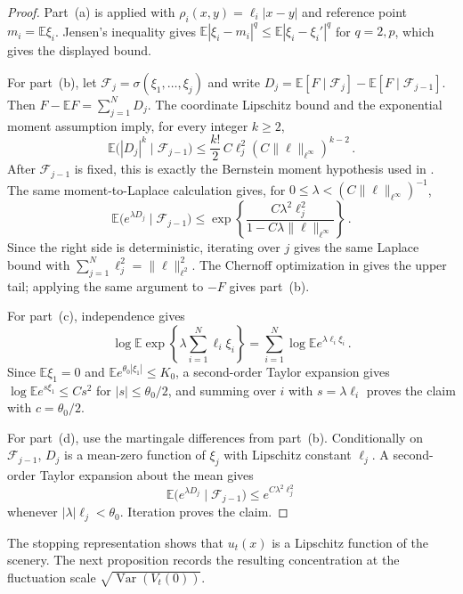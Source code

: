 \documentclass[11pt]{amsart}
\theoremstyle{plain}
\theoremstyle{definition}
\newcommand{\E}{\mathbb{E}}
\DeclareMathOperator{\Var}{Var}
\begin{document}
	\begin{proof}
		Part~\textup{(a)} is \citet[Corollary~3.1]{PinelisRecentering}
		applied with $\rho_i(x,y)=\ell_i|x-y|$ and reference point
		$m_i=\E \xi_i$. Jensen's inequality gives
		$\E|\xi_i-m_i|^q\leq \E|\xi_i-\xi_i'|^q$ for $q=2,p$, which gives
		the displayed bound.

		For part~\textup{(b)}, let
		$\mathcal F_j=\sigma(\xi_1,\ldots,\xi_j)$ and write
		$D_j=\E[F\mid \mathcal F_j]-\E[F\mid \mathcal F_{j-1}]$.
		Then $F-\E F=\sum_{j=1}^ND_j$.
		The coordinate Lipschitz bound and the exponential moment assumption
		imply, for every integer $k\geq2$,
		\[
			\E\bigl(|D_j|^k\mid \mathcal F_{j-1}\bigr)
			\leq
			\frac{k!}{2}\,C\ell_j^2(C\|\ell\|_{\ell^\infty})^{k-2}\, .
		\]
		After $\mathcal F_{j-1}$ is fixed, this is exactly the Bernstein
		moment hypothesis used in
		\citet[Theorem~2.10]{BoucheronLugosiMassart}. The same
		moment-to-Laplace calculation gives, for
		$0\leq\lambda<(C\|\ell\|_{\ell^\infty})^{-1}$,
		\[
			\E\bigl(e^{\lambda D_j}\mid \mathcal F_{j-1}\bigr)
			\leq
			\exp\left\{
			\frac{C\lambda^2\ell_j^2}{1-C\lambda\|\ell\|_{\ell^\infty}}
			\right\}\, .
		\]
		Since the right side is deterministic, iterating over $j$ gives the same Laplace bound with $\sum_{j=1}^N\ell_j^2=\|\ell\|_{\ell^2}^2$. The Chernoff optimization in
		\citet[Corollary~2.11]{BoucheronLugosiMassart} gives the upper tail; applying the same argument to $-F$ gives part~\textup{(b)}.

		For part~\textup{(c)}, independence gives
		\[
			\log\E\exp\left\{\lambda\sum_{i=1}^N\ell_i\xi_i\right\} =\sum_{i=1}^N\log\E e^{\lambda\ell_i\xi_i}\, .
		\]
		Since $\E\xi_1=0$ and $\E e^{\theta_0|\xi_1|}\leq K_0$, a
		second-order Taylor expansion gives $\log\E e^{s\xi_1}\leq Cs^2$
		for $|s|\leq\theta_0/2$, and summing over $i$ with $s=\lambda\ell_i$
		proves the claim with $c=\theta_0/2$.

		For part~\textup{(d)}, use the martingale differences from
		part~\textup{(b)}. Conditionally on $\mathcal F_{j-1}$, $D_j$ is a
		mean-zero function of $\xi_j$ with Lipschitz constant $\ell_j$.
		A second-order Taylor expansion about the mean gives
		\[
			\E\bigl(e^{\lambda D_j}\mid\mathcal F_{j-1}\bigr)
			\leq e^{C\lambda^2\ell_j^2}
		\]
		whenever $|\lambda|\ell_j<\theta_0$. Iteration proves the claim.
	\end{proof}

	The stopping representation shows that $u_t(x)$ is a Lipschitz function of the scenery. The next proposition records the resulting concentration at the fluctuation scale $\sqrt{\Var(V_t(0))}$.
\end{document}
